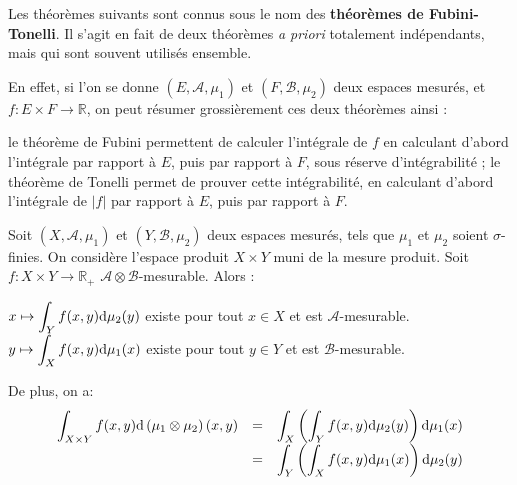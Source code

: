 \documentclass[../integ-proba.tex]{subfiles}
\begin{document}
  Les théorèmes suivants sont connus sous le nom des \textbf{théorèmes de Fubini-Tonelli}.
  Il s'agit en fait de deux théorèmes \textit{a priori} totalement indépendants, mais qui sont souvent utilisés ensemble.

  En effet, si l'on se donne $\left(E, \mathcal{A}, \mu_1\right)$ et $\left(F, \mathcal{B}, \mu_2\right)$ deux espaces mesurés, et $f:E \times F \rightarrow \mathbb{R}$, on peut résumer grossièrement ces deux théorèmes ainsi :
  \begin{itemize}
    \itemb le théorème de Fubini permettent de calculer l'intégrale de $f$ en calculant d'abord l'intégrale par rapport à $E$, puis par rapport à $F$, sous réserve d'intégrabilité ;
    \itemb le théorème de Tonelli permet de prouver cette intégrabilité, en calculant d'abord l'intégrale de $\left|f\right|$ par rapport à $E$, puis par rapport à $F$.
  \end{itemize}

  \begin{thm}
    \label{thm:fubini_positif}
    Soit $\left(X, \mathcal{A}, \mu_1\right)$ et $\left(Y, \mathcal{B}, \mu_2\right)$ deux espaces mesurés, tels que $\mu_1$ et $\mu_2$ soient $\sigma$-finies.
    On considère l'espace produit $X \times Y$ muni de la mesure produit.
    Soit $f:X \times Y \rightarrow \mathbb{R}_+$ $\mathcal{A} \otimes \mathcal{B}$-mesurable.
    Alors :
    \begin{itemize}
      \itemb $\displaystyle x \mapsto \int_Y f(x,y) \textnormal{d}\mu_2(y)$ existe pour tout $x \in X$ et est $\mathcal{A}$-mesurable.
      \itemb $\displaystyle y \mapsto \int_X f(x,y) \textnormal{d}\mu_1(x)$ existe pour tout $y \in Y$ et est $\mathcal{B}$-mesurable.
    \end{itemize}

    De plus, on a:
    $$
    {
    \everymath={\displaystyle}
    \begin{array}{rcl}
      \int_{X \times Y} f(x,y) \textnormal{d} \left(\mu_1 \otimes \mu_2 \right) (x,y) & = & \int_X \left( \int_Y f(x,y) \textnormal{d} \mu_2(y) \right) \textnormal{d} \mu_1(x)\\
                                                                                      & = & \int_Y \left( \int_X f(x,y) \textnormal{d} \mu_1(x) \right) \textnormal{d} \mu_2(y)\\
    \end{array}
    }
    $$
  \end{thm}
\end{document}
